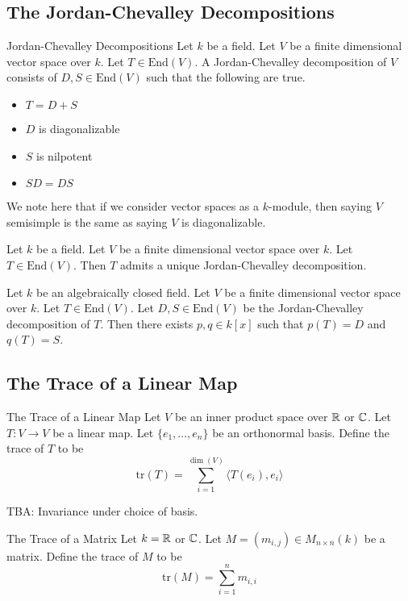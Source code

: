 \documentclass[a4paper]{article}
\begin{document}
\subsection{The Jordan-Chevalley Decompositions}
\begin{defn}{Jordan-Chevalley Decompositions}{} Let $k$ be a field. Let $V$ be a finite dimensional vector space over $k$. Let $T\in\text{End}(V)$. A Jordan-Chevalley decomposition of $V$ consists of $D,S\in\text{End}(V)$ such that the following are true. 
\begin{itemize}
\item $T=D+S$
\item $D$ is diagonalizable
\item $S$ is nilpotent
\item $SD=DS$
\end{itemize}
\end{defn}

We note here that if we consider vector spaces as a $k$-module, then saying $V$ semisimple is the same as saying $V$ is diagonalizable. 

\begin{prp}{}{} Let $k$ be a field. Let $V$ be a finite dimensional vector space over $k$. Let $T\in\text{End}(V)$. Then $T$ admits a unique Jordan-Chevalley decomposition. 
\end{prp}

\begin{prp}{}{} Let $k$ be an algebraically closed field. Let $V$ be a finite dimensional vector space over $k$. Let $T\in\text{End}(V)$. Let $D,S\in\text{End}(V)$ be the Jordan-Chevalley decomposition of $T$. Then there exists $p,q\in k[x]$ such that $p(T)=D$ and $q(T)=S$. 
\end{prp}

\subsection{The Trace of a Linear Map}
\begin{defn}{The Trace of a Linear Map}{} Let $V$ be an inner product space over $\mathbb{R}$ or $\mathbb{C}$. Let $T:V\to V$ be a linear map. Let $\{e_1,\dots,e_n\}$ be an orthonormal basis. Define the trace of $T$ to be $$\text{tr}(T)=\sum_{i=1}^{\dim(V)}\langle T(e_i),e_i\rangle$$
\end{defn}

TBA: Invariance under choice of basis. 

\begin{defn}{The Trace of a Matrix}{} Let $k=\mathbb{R}$ or $\mathbb{C}$. Let $M=(m_{i,j})\in M_{n\times n}(k)$ be a matrix. Define the trace of $M$ to be $$\text{tr}(M)=\sum_{i=1}^nm_{i,i}$$
\end{defn}
\end{document}

